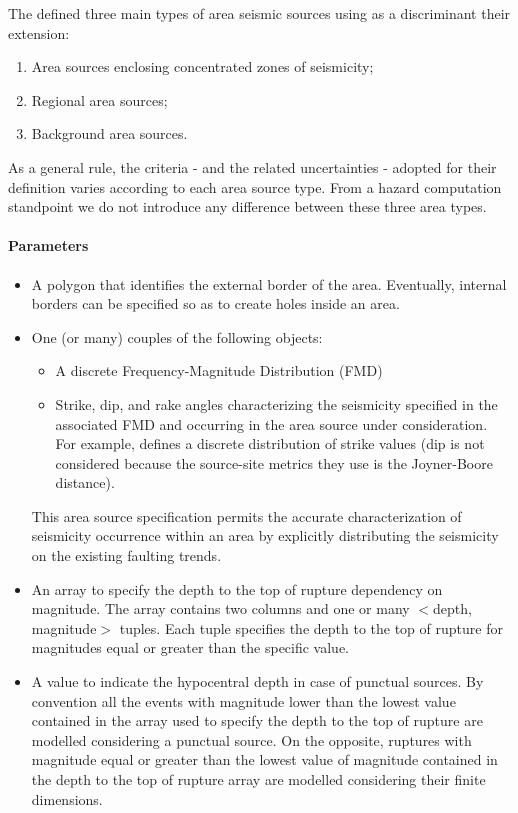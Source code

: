 The \citet{sshac1997} defined three main types of area seismic sources using as 
a discriminant their extension:
\begin{enumerate}
\item Area sources enclosing concentrated zones of seismicity;
\item Regional area sources;
\item Background area sources.
\end{enumerate}
As a general rule, the criteria - and the related uncertainties - adopted for 
their definition varies according to each area source type. From a hazard 
computation standpoint we do not introduce any difference between these three 
area types.
%
\paragraph{Parameters}
\begin{itemize}
\item A polygon that identifies the external border of the area. Eventually, 
internal borders can be specified so as to create holes inside an area.
\item One (or many) couples of the following objects:
\begin{itemize}
	\item A discrete Frequency-Magnitude Distribution (FMD)
	\item Strike, dip, and rake angles characterizing the seismicity specified 
	in the associated FMD and occurring in the area source under consideration. 
	For example, \cite{coppersmith2009} defines a discrete 
	distribution of strike values (dip is not considered because the source-site 
	metrics they use is the Joyner-Boore distance). 
\end{itemize}
This area source specification permits the accurate characterization of 
seismicity occurrence within an area by explicitly distributing the seismicity 
on the existing faulting trends. 
\item An array to specify the depth to the top of rupture dependency on magnitude. 
The array contains two columns and one or many $<$depth, magnitude$>$ tuples. 
Each tuple specifies the depth to the top of rupture for magnitudes equal or 
greater than the specific value. 
\item A value to indicate the hypocentral depth in case of punctual sources. 
By convention all the events with magnitude lower than the lowest value contained 
in the array used to specify the depth to the top of rupture are modelled 
considering a punctual source. On the opposite, ruptures with magnitude equal or 
greater than the lowest value of magnitude contained in the depth to the top of 
rupture array are modelled considering their finite dimensions. 
\end{itemize}
%
